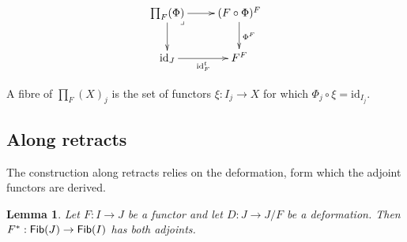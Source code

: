 \documentclass{amsart}
\theoremstyle{plain}
\newtheorem{lemma}[theorem]{Lemma}
\theoremstyle{definition}
\newcommand\id{\mathrm{id}}
\begin{document}
\[ \xymatrix{
\prod_F(\Phi)\ar[r] \ar[d]\ar@{}[dr]|<\lrcorner & (F\circ \Phi)^F\ar[d]^{\Phi^F} \\
\id_J \ar[r]_{\id_F^t} & F^F
}\]

A fibre of $\prod_F(X)_j$ is the set of functors $\xi:I_j \to X$ for which $\Phi_j\circ \xi = \id_{I_j}$.

\subsection{Along retracts}
The construction along retracts relies on the deformation, form which the adjoint functors are derived.

\begin{lemma} Let $F:I\to J$ be a functor and let $D:J \to J/F$ be a deformation. Then $F^*:\mathsf{Fib}(J) \to \mathsf{Fib}(I)$ has both adjoints. \end{lemma}
\end{document}
